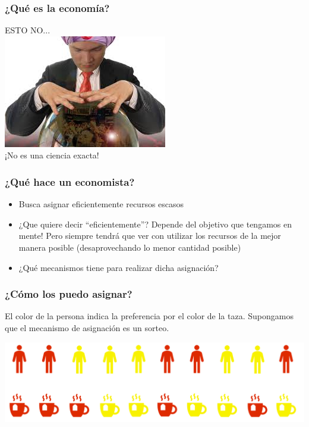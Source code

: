 \documentclass{beamer}
\begin{document}
\begin{frame}
\frametitle{¿Qué es la economía?}
ESTO NO...\vspace{1mm} \\
\centering 
\includegraphics[scale=0.7]{../Figures/Introduccion_1.2_boladecristal.jpg}
\\
¡No es una ciencia exacta!
\end{frame}

\begin{frame}
\frametitle{¿Qué hace un economista?}
\begin{itemize}
    \item Busca asignar eficientemente recursos escasos \vspace{3mm} \\
    \item ¿Que quiere decir ``eficientemente''? Depende del objetivo que tengamos en mente! Pero siempre tendrá que ver con utilizar los recursos de la mejor manera posible (desaprovechando lo menor cantidad posible) \vspace{3mm} \\
    \item ¿Qué mecanismos tiene para realizar dicha asignación? 
\end{itemize}
\end{frame}

\begin{frame}
\frametitle{¿Cómo los puedo asignar?}
El color de la persona indica la preferencia por el color de la taza. Supongamos que el mecanismo de asignación es un sorteo.
\begin{center}
    \includegraphics[scale=0.8]{../Figures/Tazon.png}
\end{center}
\end{frame}
\end{document}
